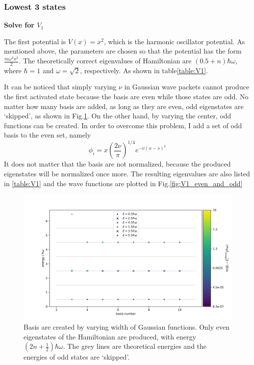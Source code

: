 \documentclass{article}
\begin{document}
\subsubsection{Lowest 3 states}
\textbf{Solve for $V_1$}\par
The first potential is $V(x) = x^2$, which is the harmonic oscillator potential. As mentioned above, the parameters are chosen so that the potential has the form $\frac{m\omega^2x^2}{2}$. The theoretically correct eigenvalues of Hamiltonian are $(0.5+n)\hbar\omega$, where $\hbar=1$ and $\omega=\sqrt{2}$, respectively. As shown in table\ref{table:V1}.\par
It can be noticed that simply varying $\nu$ in Gaussian wave packets cannot produce the first activated state because the basis are even while those states are odd. No matter how many basis are added, as long as they are even, odd eigenstates are `skipped', as shown in Fig.\ref{fig:V1_even_only}. On the other hand, by varying the center, odd functions can be created. In order to overcome this problem, I add a set of odd basis to the even set, namely
\begin{equation}\label{basis_odd_and_even}
    \phi_i = x(\frac{2\nu}{\pi})^{1/4} e^{-\nu(x-s)^2}
\end{equation}
It does not matter that the basis are not normalized, because the produced eigenstates will be normalized once more. The resulting eigenvalues are also listed in \ref{table:V1} and the wave functions are plotted in Fig.\ref{fig:V1_even_and_odd}\par

\begin{figure}[!htb]
    \centering
    \includegraphics[width=1\textwidth]{V1_even_dif_basis_num.png}
    \caption{Basis are created by varying width of Gaussian functions. Only even eigenstates of the Hamiltonian are produced, with energy $(2n+\frac{1}{2})\hbar\omega$. The grey lines are theoretical energies and the energies of odd states are `skipped'.}
    \label{fig:V1_even_only}
\end{figure}
\end{document}
